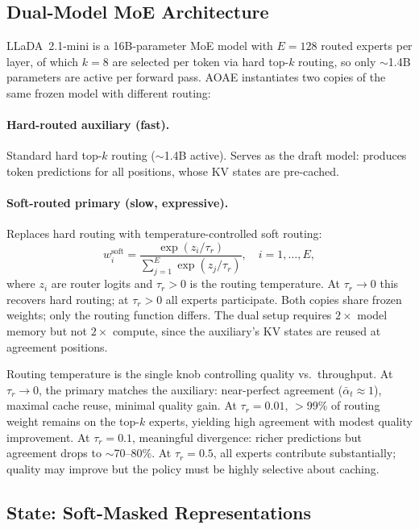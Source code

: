 \documentclass[11pt]{article}
\begin{document}
\subsection{Dual-Model MoE Architecture}
\label{sec:soft_moe}

LLaDA~2.1-mini is a 16B-parameter MoE model with $E{=}128$ routed experts per layer, of which $k{=}8$ are selected per token via hard top-$k$ routing, so only ${\sim}$1.4B parameters are active per forward pass.
AOAE instantiates two copies of the same frozen model with different routing:

\paragraph{Hard-routed auxiliary (fast).}
Standard hard top-$k$ routing (${\sim}$1.4B active).
Serves as the draft model: produces token predictions for all positions, whose KV states are pre-cached.

\paragraph{Soft-routed primary (slow, expressive).}
Replaces hard routing with temperature-controlled soft routing:
\begin{equation}
    w_i^{\text{soft}} = \frac{\exp(z_i / \tau_r)}{\sum_{j=1}^E \exp(z_j / \tau_r)}, \quad i = 1, \dots, E,
    \label{eq:soft_route}
\end{equation}
where $z_i$ are router logits and $\tau_r > 0$ is the routing temperature.
At $\tau_r \to 0$ this recovers hard routing; at $\tau_r > 0$ all experts participate.
Both copies share frozen weights; only the routing function differs.
The dual setup requires $2\times$ model memory but not $2\times$ compute, since the auxiliary's KV states are reused at agreement positions.

Routing temperature is the single knob controlling quality vs.\ throughput.
At $\tau_r \to 0$, the primary matches the auxiliary: near-perfect agreement ($\bar{\alpha}_t \approx 1$), maximal cache reuse, minimal quality gain.
At $\tau_r = 0.01$, $>$99\% of routing weight remains on the top-$k$ experts, yielding high agreement with modest quality improvement.
At $\tau_r = 0.1$, meaningful divergence: richer predictions but agreement drops to ${\sim}$70--80\%.
At $\tau_r = 0.5$, all experts contribute substantially; quality may improve but the policy must be highly selective about caching.

\subsection{State: Soft-Masked Representations}
\label{sec:state}
\end{document}

